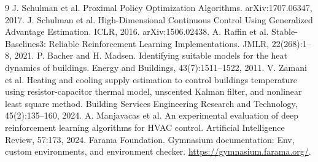\documentclass[10pt,a4paper]{article}
\begin{document}
\begin{thebibliography}{9}
\setlength{\itemsep}{2pt}
 J. Schulman et al. Proximal Policy Optimization Algorithms. arXiv:1707.06347, 2017.
 J. Schulman et al. High-Dimensional Continuous Control Using Generalized Advantage Estimation. ICLR, 2016. arXiv:1506.02438.
 A. Raffin et al. Stable-Baselines3: Reliable Reinforcement Learning Implementations. JMLR, 22(268):1--8, 2021.
 P. Bacher and H. Madsen. Identifying suitable models for the heat dynamics of buildings. Energy and Buildings, 43(7):1511--1522, 2011.
 V. Zamani et al. Heating and cooling supply estimation to control buildings temperature using resistor-capacitor thermal model, unscented Kalman filter, and nonlinear least square method. Building Services Engineering Research and Technology, 45(2):135--160, 2024.
 A. Manjavacas et al. An experimental evaluation of deep reinforcement learning algorithms for HVAC control. Artificial Intelligence Review, 57:173, 2024.
 Farama Foundation. Gymnasium documentation: Env, custom environments, and environment checker. \url{https://gymnasium.farama.org/}.
\end{thebibliography}
\end{document}
